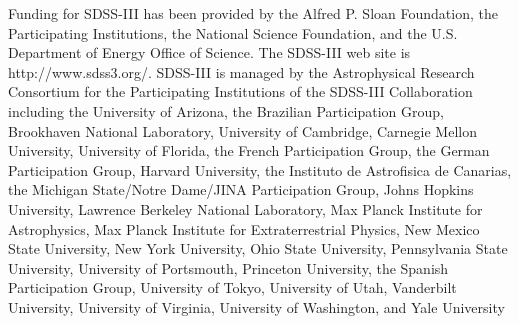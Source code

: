 \documentclass[authoryear, 12pt, 5p, times]{elsarticle}
\begin{document}
Funding for SDSS-III has been provided by the Alfred P. Sloan Foundation, the Participating Institutions, the National Science Foundation, and the U.S. Department of Energy Office of Science. The SDSS-III web site is http://www.sdss3.org/. SDSS-III is managed by the Astrophysical Research Consortium for the Participating Institutions of the SDSS-III Collaboration including the University of Arizona, the Brazilian Participation Group, Brookhaven National Laboratory, University of Cambridge, Carnegie Mellon University, University of Florida, the French Participation Group, the German Participation Group, Harvard University, the Instituto de Astrofisica de Canarias, the Michigan State/Notre Dame/JINA Participation Group, Johns Hopkins University, Lawrence Berkeley National Laboratory, Max Planck Institute for Astrophysics, Max Planck Institute for Extraterrestrial Physics, New Mexico State University, New York University, Ohio State University, Pennsylvania State University, University of Portsmouth, Princeton University, the Spanish Participation Group, University of Tokyo, University of Utah, Vanderbilt University, University of Virginia, University of Washington, and Yale University



\end{document}
